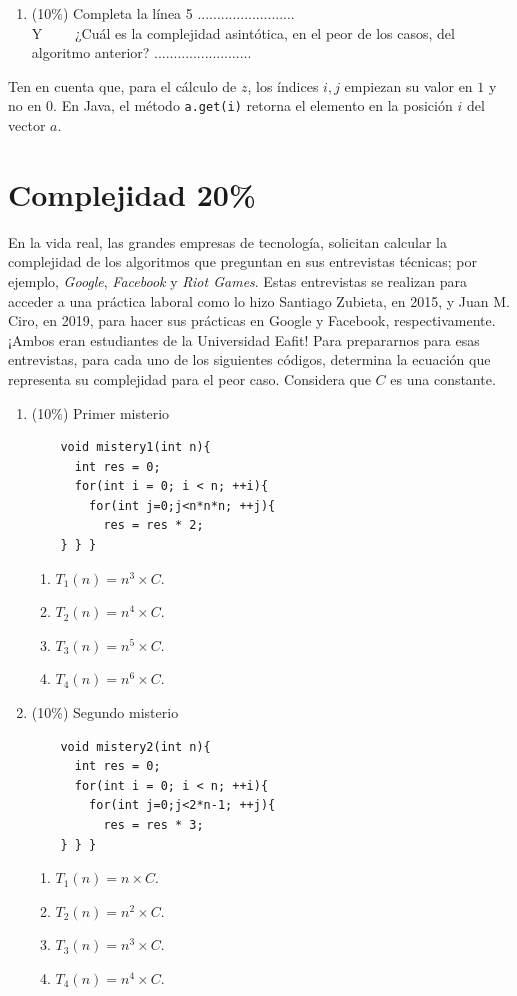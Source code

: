 \documentclass[10 pt]{article}
\begin{document}
\begin{multicols}{2}
\begin{lstlisting}
\end{lstlisting}
\begin{enumerate}[label=\Alph*]
	\item (10\%) Completa la línea 5
	 .........................\\
	Y \ \ \ \  ¿Cuál es la complejidad asintótica, en el peor de los casos, del algoritmo anterior?
	.........................
\end{enumerate}

Ten en cuenta que, para el cálculo de $z$, los índices $i,j$ empiezan su valor en $1$ y no en $0$. En Java, el método 
\texttt{a.get(i)} retorna el elemento en la posición $i$ del vector $a$.

\section{Complejidad 20\%}
En la vida real, las grandes empresas de tecnología, solicitan calcular la complejidad de los algoritmos que preguntan en sus entrevistas técnicas; por ejemplo, \textit{Google}, \textit{Facebook} y \textit{Riot Games}. Estas entrevistas se realizan para acceder a una práctica laboral como lo hizo Santiago Zubieta, en 2015, y Juan M. Ciro, en 2019, para hacer sus prácticas en Google y Facebook, respectivamente. ¡Ambos eran estudiantes de la Universidad Eafit! Para prepararnos para esas entrevistas, para cada uno de los siguientes códigos, determina la ecuación que representa su complejidad para el peor caso. Considera que $C$ es una constante.

\begin{enumerate}[label=\Alph*]
	\item (10\%) Primer misterio
	\begin{lstlisting}
	void mistery1(int n){
	  int res = 0;
	  for(int i = 0; i < n; ++i){
	    for(int j=0;j<n*n*n; ++j){
	      res = res * 2;
	} } }
	\end{lstlisting}
	\begin{enumerate}
		\item $T_1(n) = n^3 \times C$.
		\item $T_2(n) = n^4 \times C$.
		\item $T_3(n) = n^5 \times C$.
		\item $T_4(n) = n^6 \times C$.
	\end{enumerate}
	\item (10\%) Segundo misterio
	\begin{lstlisting}
	void mistery2(int n){
	  int res = 0;
	  for(int i = 0; i < n; ++i){
	    for(int j=0;j<2*n-1; ++j){
	      res = res * 3;
	} }	}
	\end{lstlisting}
	\begin{enumerate}
		\item $T_1(n) = n \times C$.
		\item $T_2(n) = n^2 \times C$.
		\item $T_3(n) = n^3 \times C$.
		\item $T_4(n) = n^4 \times C$.
	\end{enumerate}
\end{enumerate}


\end{multicols}
\end{document}
